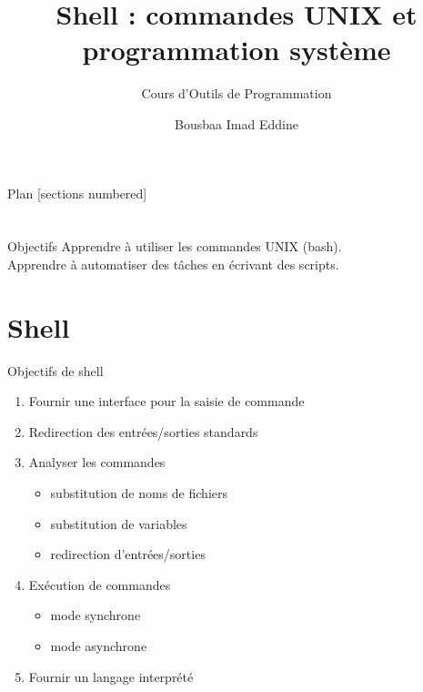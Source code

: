 \documentclass[10pt]{beamer}
\title{Shell : commandes UNIX et programmation système}
\subtitle{Cours d'Outils de Programmation}
\date{}
\author{Bousbaa Imad Eddine}
\institute{Université des Sciences et de la Technologie de Houari Boumediène}
\begin{document}
\maketitle

\begin{frame}{Plan}
  [sections numbered]
  \tableofcontents[hideallsubsections]
\end{frame}

\section{}

\begin{frame}[fragile]{Objectifs}
Apprendre à utiliser les commandes UNIX (bash).\\
Apprendre à automatiser des tâches en écrivant des scripts.\\

\end{frame}

\section{Shell}

\begin{frame}{Objectifs de shell}
\begin{enumerate}
\item Fournir une interface pour la saisie de commande
\item Redirection des entrées/sorties standards
\item Analyser les commandes
\begin{itemize}
	\item substitution de noms de fichiers
	\item substitution de variables
	\item redirection d'entrées/sorties
\end{itemize}
\item Exécution de commandes
\begin{itemize}
\item mode synchrone
\item mode asynchrone
\end{itemize}
\item Fournir un langage interprété
\end{enumerate}
\end{frame}
\end{document}

